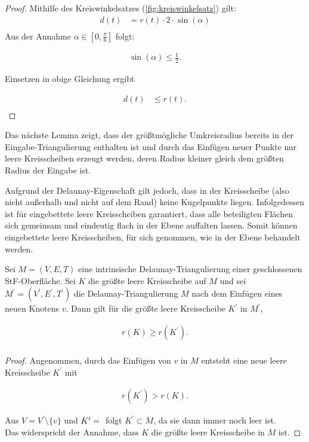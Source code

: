 \newpage
\begin{proof}
Mithilfe des Kreiswinkelsatzes (\ref{fig:kreiswinkelsatz}) gilt:
\begin{align*}
d(t) &= r(t)\cdot 2\cdot\sin(\alpha)  \\
\end{align*}
Aus der Annahme $\alpha \in [0,\frac{\pi}{6}] $ folgt:

\begin{align*}
    \sin(\alpha) \leq \frac{1}{2}.
\end{align*}

Einsetzen in obige Gleichung ergibt 

\begin{align*}
     d(t) &\leq r(t).\\
\end{align*}
\end{proof}

Das nächste Lemma zeigt, dass der größtmögliche Umkreisradius bereits in der Eingabe-Triangulierung enthalten ist und durch das Einfügen neuer Punkte nur leere Kreisscheiben erzeugt werden, deren Radius kleiner gleich dem größten Radius der Eingabe ist. 



Aufgrund der Delaunay-Eigenschaft gilt jedoch, dass in der Kreisscheibe (also nicht außerhalb und nicht auf dem Rand) keine Kugelpunkte liegen. Infolgedessen ist für eingebettete leere Kreisscheiben garantiert, dass alle beteiligten Flächen sich gemeinsam und eindeutig flach in der Ebene auffalten lassen. Somit können eingebettete leere Kreisscheiben, für sich genommen, wie in der Ebene behandelt werden. 



\begin{lemma}
\label{le:auffaltung}
Sei $M = (V,E,T)$ eine intrinsische Delaunay-Triangulierung  einer geschlossenen StF-Oberfläche. Sei $K$  die größte leere Kreisscheibe auf $M$ und sei $M^\prime = (V^\prime,E^\prime,T^\prime)$ die Delaunay-Triangulierung  $M$ nach dem Einfügen eines neuen Knotens $v$. 
Dann gilt für die größte leere Kreisscheibe $K^\prime$ in $M^\prime$,

\begin{align*}
    r(K) \geq r(K^\prime).\\
\end{align*}
\end{lemma}

\begin{proof}

Angenommen, durch das Einfügen von $v$ in $M$ entsteht eine neue leere Kreisscheibe $K^\prime$ mit 

\begin{align*}
    r(K^\prime) > r(K).
\end{align*}

Aus $V = V^\prime \setminus \{v\}$ und $K^\prime = \emph{}$ folgt $K^\prime \subset M$, da sie dann immer noch leer ist.\\ Das widerspricht der Annahme, dass $K$ die größte leere Kreisscheibe in $M$ ist.

\end{proof}






